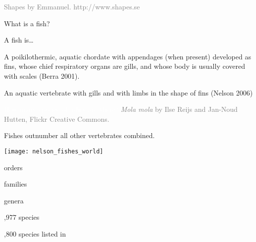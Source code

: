 \documentclass[t]{beamer}
\begin{document}
{
\begin{frame}[b,plain]{}
\hfill\tiny\textcolor{gray}{Shapes by Emmanuel. http://www.shapes.se}
\end{frame}
}

{
\begin{frame}[t,plain]{What is a fish?}
\end{frame}
}


\begin{frame}[t,plain]{A fish is\dots}

	\hangpara A poikilothermic, aquatic chordate with appendages (when present) developed as fins, whose chief respiratory organs are gills, and whose body is usually covered with scales (Berra 2001).

	\hangpara An aquatic vertebrate with gills and with limbs in the shape of fins (Nelson 2006)

\end{frame}

{
\begin{frame}[b,plain]{\textcolor{white}{How many species of fishes are there?}}
	\hfill\tiny\textcolor{gray}{\textit{Mola mola} by Ilse Reijs and Jan-Noud Hutten, Flickr Creative Commons.}
\end{frame}
}

\begin{frame}[t,plain]{Fishes outnumber all other vertebrates combined.}
\begin{multicols}{2}
	\begin{center}
		\texttt{[image: nelson\_fishes\_world]} \\
	\end{center}
	
	\columnbreak
	
	 orders

	 families
		
	 genera
		
	,977 species
	
	,800 species listed in {\small{}}
		
\end{multicols}
\end{frame}
\end{document}
